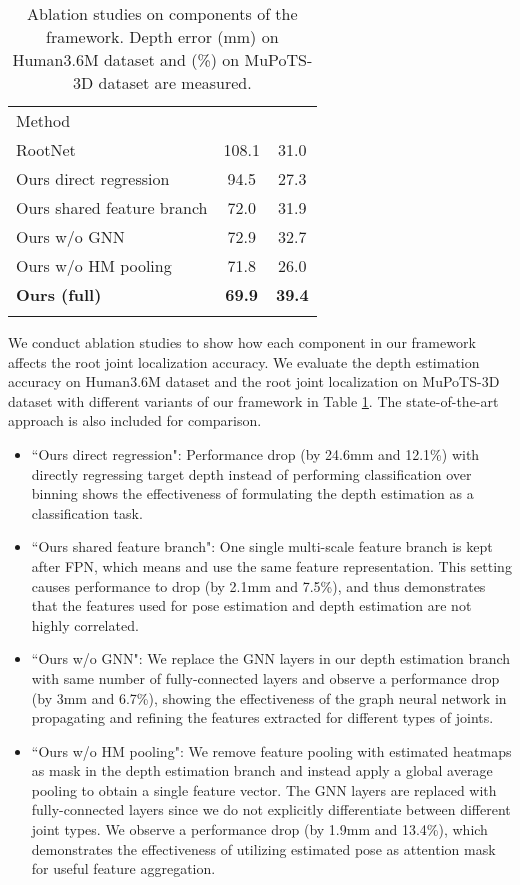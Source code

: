 \documentclass[runningheads]{llncs}
\begin{document}
\setlength{\tabcolsep}{4pt}
\begin{table}[t]
\begin{center}
\caption{Ablation studies on components of the framework. Depth error  (mm) on Human3.6M dataset and  (\%) on MuPoTS-3D dataset are measured.}
\label{table:ablation}
\begin{tabular}{l|c|c}
\hline\noalign{\smallskip}
Method &  & \\
\noalign{\smallskip}
\hline
\noalign{\smallskip}
RootNet \cite{Moon_2019_ICCV_3DMPPE} & 108.1 & 31.0\\
Ours direct regression & 94.5 & 27.3\\
Ours shared feature branch & 72.0 & 31.9\\
Ours w/o GNN & 72.9 & 32.7\\
Ours w/o HM pooling & 71.8 & 26.0\\
\textbf{Ours (full)} & \textbf{69.9} & \textbf{39.4}\\
\noalign{\smallskip}
\hline
\end{tabular}
\end{center}
\end{table}
\setlength{\tabcolsep}{1.4pt}

We conduct ablation studies to show how each component in our framework affects the root joint localization accuracy. We evaluate the depth estimation accuracy  on Human3.6M dataset and the root joint localization  on MuPoTS-3D dataset with different variants of our framework in Table \ref{table:ablation}.
The state-of-the-art approach \cite{Moon_2019_ICCV_3DMPPE} is also included for comparison.
\begin{itemize}
\item ``Ours direct regression":
Performance drop (by 24.6mm and 12.1\%) with directly regressing target depth instead of performing classification over binning shows the effectiveness of formulating the depth estimation as a classification task.
\item ``Ours shared feature branch": One single multi-scale feature branch is kept after FPN, which means  and  use the same feature representation. This setting causes performance to drop (by 2.1mm and 7.5\%), and thus demonstrates that the features used for pose estimation and depth estimation are not highly correlated.
\item ``Ours w/o GNN": We replace the GNN layers in our depth estimation branch with same number of fully-connected layers and observe a performance drop (by 3mm and 6.7\%), showing the effectiveness of the graph neural network in propagating and refining the features extracted for different types of joints.
\item ``Ours w/o HM pooling": We remove feature pooling with estimated heatmaps as mask in the depth estimation branch and instead apply a global average pooling to obtain a single feature vector. The GNN layers are replaced with fully-connected layers since we do not explicitly differentiate between different joint types. We observe a performance drop (by 1.9mm and 13.4\%), which demonstrates the effectiveness of utilizing estimated pose as attention mask for useful feature aggregation.
\end{itemize}
\end{document}
